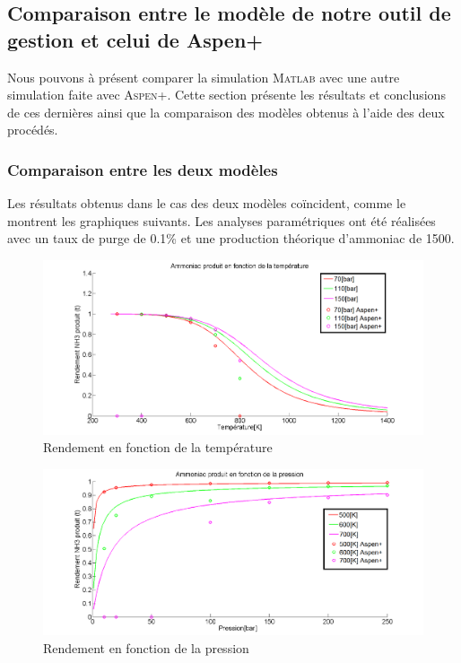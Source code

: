 
\subsection{Comparaison entre le modèle de notre outil de gestion et celui de Aspen+}
Nous pouvons à présent comparer la simulation \textsc{Matlab} avec une autre 
simulation faite avec \textsc{Aspen+}. Cette section présente les résultats et conclusions de ces dernières ainsi que la comparaison des modèles obtenus à l'aide des deux procédés.

\subsubsection{Comparaison entre les deux modèles}
Les résultats obtenus dans le cas des deux modèles coïncident, comme le montrent les graphiques suivants. Les analyses paramétriques ont été réalisées avec un taux de purge de 0.1\% et une production théorique d'ammoniac de \unit{1500}{\tonne\per\jour}.

\begin{figure}[ht!]
 \centering
 \includegraphics[scale=0.35]{GrapheCompT.png}
 \caption{Rendement en fonction de la température}
 \label{scheme}
\end{figure}

\begin{figure}[ht!]
 \centering
 \includegraphics[scale=0.35]{GrapheCompP.png}
 \caption{Rendement en fonction de la pression}
 \label{scheme}
\end{figure}

